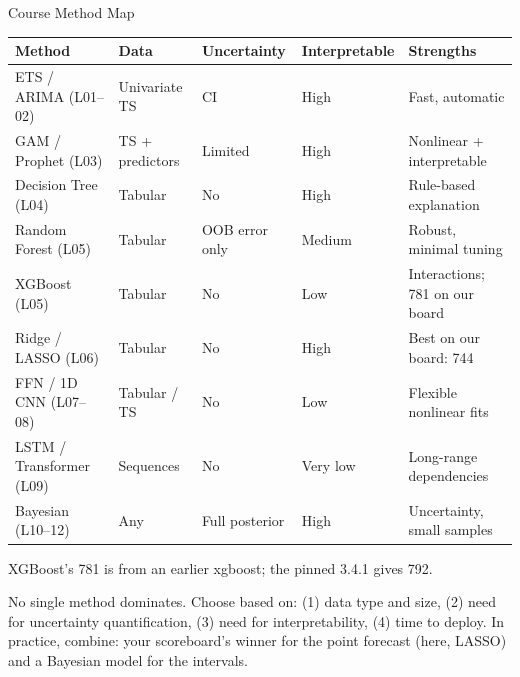 \documentclass[aspectratio=169, 11pt]{beamer}
\begin{document}
\begin{frame}{Course Method Map}
  \begin{center}
    {\scriptsize
    \begin{tabular}{lllll}
      \toprule
      \textbf{Method} & \textbf{Data} & \textbf{Uncertainty} & \textbf{Interpretable} & \textbf{Strengths} \\
      \midrule
      ETS / ARIMA (L01--02) & Univariate TS & CI & High & Fast, automatic \\
      GAM / Prophet (L03) & TS + predictors & Limited & High & Nonlinear + interpretable \\
      Decision Tree (L04) & Tabular & No & High & Rule-based explanation \\
      Random Forest (L05) & Tabular & OOB error only & Medium & Robust, minimal tuning \\
      XGBoost (L05) & Tabular & No & Low & Interactions; 781 on our board \\
      Ridge / LASSO (L06) & Tabular & No & High & Best on our board: 744 \\
      FFN / 1D CNN (L07--08) & Tabular / TS & No & Low & Flexible nonlinear fits \\
      LSTM / Transformer (L09) & Sequences & No & Very low & Long-range dependencies \\
      Bayesian (L10--12) & Any & Full posterior & High & Uncertainty, small samples \\
      \bottomrule
    \end{tabular}
    }

    {\scriptsize\color{unogray} XGBoost's 781 is from an earlier xgboost; the pinned 3.4.1 gives 792.\par}
  \end{center}
  \begin{keybox}
    \small No single method dominates. Choose based on:
    (1) data type and size, (2) need for uncertainty quantification,
    (3) need for interpretability, (4) time to deploy.
    In practice, combine: your scoreboard's winner for the point forecast (here, LASSO)
    and a Bayesian model for the intervals.
  \end{keybox}
\end{frame}
\end{document}
